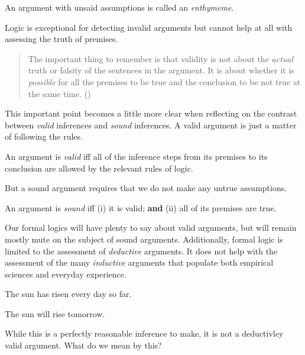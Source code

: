 \begin{definition}[Enthymeme]
  \label{def:enthymeme}
  An argument with unsaid assumptions is called an \emph{enthymeme}.
\end{definition}

Logic is exceptional for detecting invalid arguments but cannot help at all with
assessing the truth of premises.

\begin{quote}
  The important thing to remember is that validity is not about the
  \emph{actual} truth or falsity of the sentences in the argument. It is about
  whether it is \emph{possible} for all the premises to be true and the
  conclusion to be not true at the same time. (\cite[][p15]{Mag25})
\end{quote}

This important point becomes a little more clear when reflecting on the contrast
between \emph{valid} inferences and \emph{sound} inferences. A valid argument
is just a matter of following the rules.

\begin{definition}
  An argument is \emph{valid} iff all of the inference steps from its premises
  to its conclusion are allowed by the relevant rules of logic.
\end{definition}

But a sound argument requires that we do not make any untrue assumptions.

\begin{definition}
  An argument is \emph{sound} iff (i) it is valid; \textbf{and} (ii) all of
  its premises are true.
\end{definition}

Our formal logics will have plenty to say about valid arguments, but will remain
mostly mute on the subject of sound arguments. Additionally, formal logic is
limited to the assessment of \emph{deductive} arguments. It does not help with
the assessment of the many \emph{inductive} arguments that populate both
empirical sciences and everyday experience.

\begin{argument}
\item[] The sun has risen every day so far.
\item[\therefore] The sun will rise tomorrow.
\end{argument}

While this is a perfectly reasonable inference to make, it is not a deductivley
valid argument. What do we mean by this?

